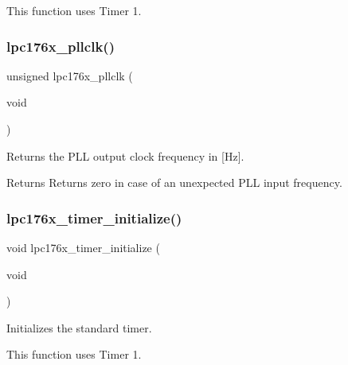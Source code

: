 This function uses Timer 1. \mbox{\label{group__lpc176x__clock_ga1838b91b836f6ac5a926f2976cc3ff91}} 
\subsubsection{\texorpdfstring{lpc176x\_pllclk()}{lpc176x\_pllclk()}}
{\footnotesize\ttfamily unsigned lpc176x\+\_\+pllclk (\begin{DoxyParamCaption}\item[{void}]{ }\end{DoxyParamCaption})}



Returns the P\+LL output clock frequency in \mbox{[}Hz\mbox{]}. 

\begin{DoxyReturn}{Returns}
Returns zero in case of an unexpected P\+LL input frequency. 
\end{DoxyReturn}
\mbox{\label{group__lpc176x__clock_ga36b647bb6e1c61bb2b688eab520effc7}} 
\subsubsection{\texorpdfstring{lpc176x\_timer\_initialize()}{lpc176x\_timer\_initialize()}}
{\footnotesize\ttfamily void lpc176x\+\_\+timer\+\_\+initialize (\begin{DoxyParamCaption}\item[{void}]{ }\end{DoxyParamCaption})}



Initializes the standard timer. 

This function uses Timer 1. 